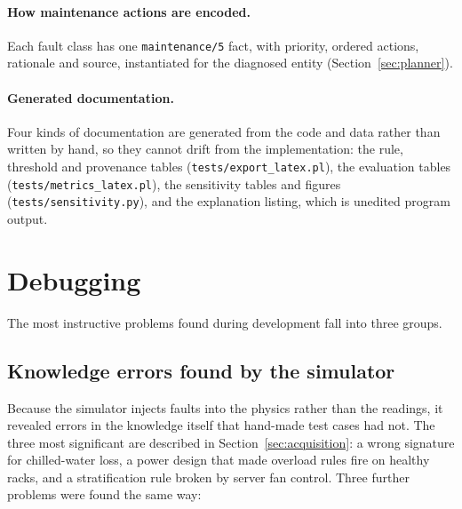 \paragraph{How maintenance actions are encoded.} Each fault class has one \texttt{maintenance/5} fact, with priority, ordered actions, rationale and source, instantiated for the diagnosed entity (Section~\ref{sec:planner}).

\paragraph{Generated documentation.} Four kinds of documentation are generated from the code and data rather than written by hand, so they cannot drift from the implementation: the rule, threshold and provenance tables (\texttt{tests/export\_latex.pl}), the evaluation tables (\texttt{tests/metrics\_latex.pl}), the sensitivity tables and figures (\texttt{tests/sensitivity.py}), and the explanation listing, which is unedited program output.

\section{Debugging}
\label{sec:debugging}

The most instructive problems found during development fall into three groups.

\subsection{Knowledge errors found by the simulator}

Because the simulator injects faults into the physics rather than the readings, it revealed errors in the knowledge itself that hand-made test cases had not. The three most significant are described in Section~\ref{sec:acquisition}: a wrong signature for chilled-water loss, a power design that made overload rules fire on healthy racks, and a stratification rule broken by server fan control. Three further problems were found the same way:

